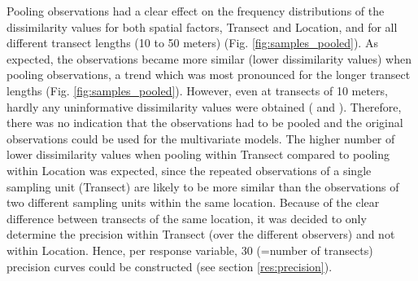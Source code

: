 \documentclass[10pt,letterpaper]{article}
\begin{document}
Pooling observations had a clear effect on the frequency distributions of the dissimilarity values for both spatial factors, Transect and Location, and for all different transect lengths (10 to 50 meters) (Fig. \ref{fig:samples_pooled}). As expected, the observations became more similar (lower dissimilarity values) when pooling observations, a trend which was most pronounced for the longer transect lengths (Fig. \ref{fig:samples_pooled}). However, even at transects of 10 meters, hardly any uninformative dissimilarity values were obtained ( and ).  
Therefore, there was no indication that the observations had to be pooled and the original observations could be used for the multivariate models. The higher number of lower dissimilarity values when pooling within Transect compared to pooling within Location was expected, since the repeated observations of a single sampling unit (Transect) are likely to be more similar than the observations of two different sampling units within the same location. Because of the clear difference between transects of the same location, it was decided to only determine the precision within Transect (over the different observers) and not within Location. Hence, per response variable, 30 (=number of transects) precision curves could be constructed (see section \ref{res:precision}).
\end{document}
